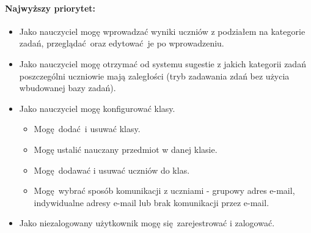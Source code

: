 \documentclass[polish,12pt]{aghthesis}
\begin{document}
\paragraph{Najwyższy priorytet:}
\begin{itemize}
	\item Jako nauczyciel mogę wprowadzać wyniki uczniów z podziałem na kategorie zadań, przeglądać oraz edytować je po wprowadzeniu.
	\item Jako nauczyciel mogę otrzymać od systemu sugestie z jakich kategorii zadań poszczególni uczniowie mają zaległości (tryb zadawania zdań bez użycia wbudowanej bazy zadań).
	\item Jako nauczyciel mogę konfigurować klasy.
	\begin{itemize}
		\item Mogę dodać i usuwać klasy.
		\item Mogę ustalić nauczany przedmiot w danej klasie.
		\item Mogę dodawać i usuwać uczniów do klas.
		\item Mogę wybrać sposób komunikacji z uczniami - grupowy adres e-mail, indywidualne adresy e-mail lub brak komunikacji przez e-mail.
	\end{itemize}
	\item Jako niezalogowany użytkownik mogę się zarejestrować i zalogować.
\end{itemize}
\end{document}
